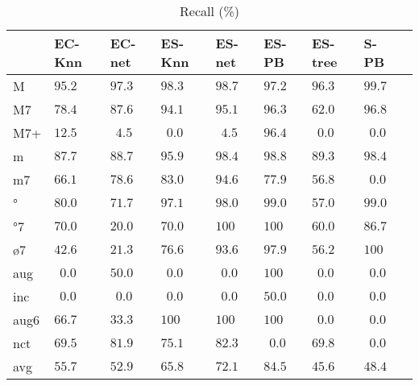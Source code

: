 \documentclass{article}
\begin{document}
\begin{table}
  \centering
\begin{tabular}{l|p{0.5cm}p{0.5cm}p{0.5cm}p{0.5cm}p{0.5cm}p{0.5cm}p{0.5cm}p{0.5cm}}
     &   EC-Knn &   EC-net &   ES-Knn &   ES-net &    ES-PB &  ES-tree &     S-PB \\ \hline
   M & $  95.2$ & $  97.3$ & $  98.3$ & $  98.7$ & $  97.2$ & $  96.3$ & $  99.7$ \\
  M7 & $  78.4$ & $  87.6$ & $  94.1$ & $  95.1$ & $  96.3$ & $  62.0$ & $  96.8$ \\
 M7+ & $  12.5$ & $ ~~4.5$ & $ ~~0.0$ & $ ~~4.5$ & $  96.4$ & $ ~~0.0$ & $ ~~0.0$ \\
   m & $  87.7$ & $  88.7$ & $  95.9$ & $  98.4$ & $  98.8$ & $  89.3$ & $  98.4$ \\
  m7 & $  66.1$ & $  78.6$ & $  83.0$ & $  94.6$ & $  77.9$ & $  56.8$ & $ ~~0.0$ \\
   ° & $  80.0$ & $  71.7$ & $  97.1$ & $  98.0$ & $  99.0$ & $  57.0$ & $  99.0$ \\
  °7 & $  70.0$ & $  20.0$ & $  70.0$ & $ 100  $ & $ 100  $ & $  60.0$ & $  86.7$ \\
  ø7 & $  42.6$ & $  21.3$ & $  76.6$ & $  93.6$ & $  97.9$ & $  56.2$ & $ 100$ \\
 aug & $ ~~0.0$ & $  50.0$ & $ ~~0.0$ & $ ~~0.0$ & $ 100  $ & $ ~~0.0$ & $ ~~0.0$ \\
 inc & $ ~~0.0$ & $ ~~0.0$ & $ ~~0.0$ & $ ~~0.0$ & $  50.0$ & $ ~~0.0$ & $ ~~0.0$ \\
aug6 & $  66.7$ & $  33.3$ & $ 100  $ & $ 100  $ & $ 100  $ & $ ~~0.0$ & $ ~~0.0$ \\
 nct & $  69.5$ & $  81.9$ & $  75.1$ & $  82.3$ & $ ~~0.0$ & $  69.8$ & $ ~~0.0$ \\
\hline                                                       
 avg & $  55.7$ & $  52.9$ & $  65.8$ & $  72.1$ & $  84.5$ & $  45.6$ & $  48.4$ \\
\end{tabular}


  \caption{Recall (\%)}
  \label{tab:recall}
\end{table}
\end{document}
